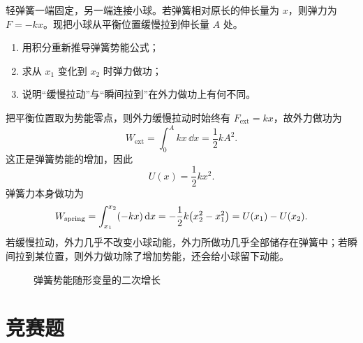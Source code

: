 \begin{classic}
轻弹簧一端固定，另一端连接小球。若弹簧相对原长的伸长量为 $x$，则弹力为 $F=-kx$。现把小球从平衡位置缓慢拉到伸长量 $A$ 处。
\begin{enumerate}
  \item 用积分重新推导弹簧势能公式；
  \item 求从 $x_1$ 变化到 $x_2$ 时弹力做功；
  \item 说明“缓慢拉动”与“瞬间拉到”在外力做功上有何不同。
\end{enumerate}
\begin{solution}
把平衡位置取为势能零点，则外力缓慢拉动时始终有 $F_{\text{ext}}=kx$，故外力做功为
\[
W_{\text{ext}}=\int_0^A kx\,\dd x=\frac12 kA^2.
\]
这正是弹簧势能的增加，因此
\[
U(x)=\frac12 kx^2.
\]
弹簧力本身做功为
\[
W_{\text{spring}}=\int_{x_1}^{x_2} (-kx)\,\dd x=-\frac12 k\qty(x_2^2-x_1^2)=U(x_1)-U(x_2).
\]
若缓慢拉动，外力几乎不改变小球动能，外力所做功几乎全部储存在弹簧中；若瞬间拉到某位置，则外力做功除了增加势能，还会给小球留下动能。

\begin{figure}[H]
\centering
{}
\caption{弹簧势能随形变量的二次增长}
\end{figure}
\end{solution}
\end{classic}

\section{竞赛题}

